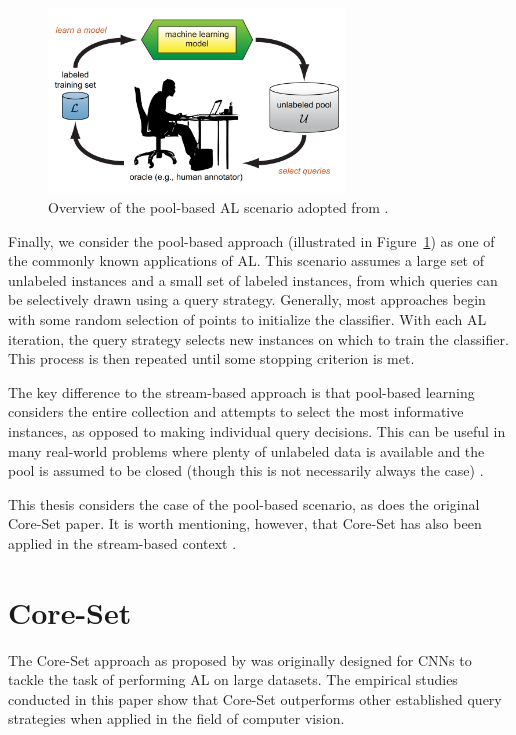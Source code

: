 \documentclass[english,bachelor,ul]{webisthesis} %
\begin{document}
\begin{figure}[htbp]
    \centering
    \includegraphics[width=0.7\textwidth]{img/al.png}
    \caption{Overview of the pool-based AL scenario adopted from \cite{settles.tr09}.}
    \label{fig:activelearning}
\end{figure}

Finally, we consider the pool-based approach (illustrated in Figure~\ref{fig:activelearning}) as one of the commonly known applications of AL. This scenario assumes a large set of unlabeled instances and a small set of labeled instances, from which queries can be selectively drawn using a query strategy. Generally, most approaches begin with some random selection of points to initialize the classifier. With each AL iteration, the query strategy selects new instances on which to train the classifier. This process is then repeated until some stopping criterion is met. 

The key difference to the stream-based approach is that pool-based learning considers the entire collection and attempts to select the most informative instances, as opposed to making individual query decisions. This can be useful in many real-world problems where plenty of unlabeled data is available and the pool is assumed to be closed (though this is not necessarily always the case) \citep{settles.tr09}.

This thesis considers the case of the pool-based scenario, as does the original Core-Set paper. It is worth mentioning, however, that Core-Set has also been applied in the stream-based context \citep{DBLP:conf/icml/SaranYK0A23}.

\section{Core-Set}

The Core-Set approach as proposed by \cite{DBLP:conf/iclr/SenerS18} was originally designed for CNNs to tackle the task of performing AL on large datasets. The empirical studies conducted in this paper show that Core-Set outperforms other established query strategies when applied in the field of computer vision.
\end{document}
